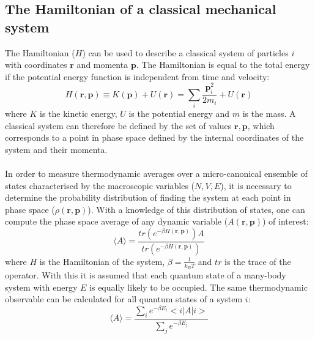 \subsection{The Hamiltonian of a classical mechanical system}
The Hamiltonian ($H$) can be used to describe a classical system of particles $i$ with coordinates $\mathbf{r}$ and momenta $\mathbf{p}$. The Hamiltonian is equal to the total energy if the potential energy function is independent from time and velocity:
%
%
\begin{equation}
H(\mathbf{r}, \mathbf{p}) \equiv K(\mathbf{p}) + U(\mathbf{r}) = \sum_{i} \frac{\mathbf{p}_{i}^{2}}{2m_{i}} + U(\mathbf{r})
\end{equation}
%
%
where $K$ is the kinetic energy, $U$ is the potential energy and $m$ is the mass. A classical system can therefore be defined by the set of values ${\mathbf{r}, \mathbf{p}}$, which corresponds to a point in phase space defined by the internal coordinates of the system and their momenta. 
%
%
\\\\
%
%
In order to measure thermodynamic averages over a micro-canonical ensemble of states characterised by the macroscopic variables ($N,V,E$), it is necessary to determine the probability distribution of finding the system at each point in phase space ($\rho(\mathbf{r}, \mathbf{p})$). With a knowledge of this distribution of states, one can compute the phase space average of any dynamic variable ($A(\mathbf{r}, \mathbf{p})$) of interest:
%
%
\begin{equation}
\langle A \rangle = \frac{tr \left( e^{- \beta H(\mathbf{r}, \mathbf{p}) } \right) A }{tr \left( e^{- \beta H(\mathbf{r}, \mathbf{p}) } \right) }
\label{equ:classical_ens_obs}
\end{equation}
%
%
where $H$ is the Hamiltonian of the system, $\beta = \frac{1}{k_{B}T}$ and $tr$ is the trace of the operator. With this it is assumed that each quantum state of a many-body system with energy $E$ is equally likely to be occupied. The same thermodynamic observable can be calculated for all quantum states of a system $i$:
%
%
\begin{equation}
\langle A \rangle = \frac{\sum_{i} e^{- \beta E_{i} } < i | A | i > }{\sum_{j} e^{- \beta E_{j} }}
\label{equ:quantum_obs}
\end{equation}
%
%
